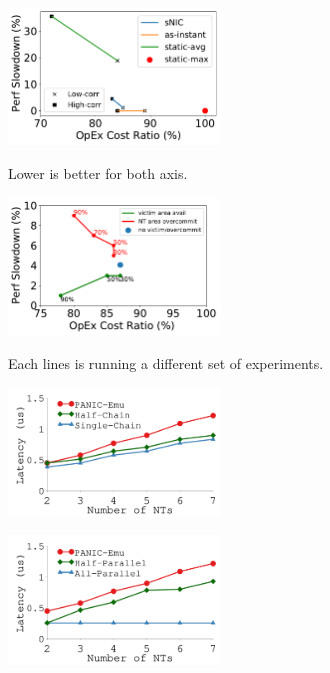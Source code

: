 {
\begin{figure}[t]
\begin{center}
\centerline{\includegraphics[width=0.5\textwidth]{snic/Figures/fig-conslid-overview-new.pdf}}
{
Lower is better for both axis.
}
\end{center}
\end{figure}
}
{
\begin{figure}[th]
\begin{center}
\centerline{\includegraphics[width=0.5\textwidth]{snic/Figures/fig-single-snic-low-corr.pdf}}
{
Each lines is running a different set of experiments.
}
\end{center}
\end{figure}
}
{
\begin{figure}[th]
\begin{center}
\centerline{\includegraphics[width=0.5\textwidth]{snic/Figures/g_plot_nt_chain.pdf}}
{
}
\end{center}
\end{figure}
}
{
\begin{figure}[th]
\begin{center}
\centerline{\includegraphics[width=0.5\textwidth]{snic/Figures/g_plot_nt_parallel.pdf}}
{
}
\end{center}
\end{figure}
}